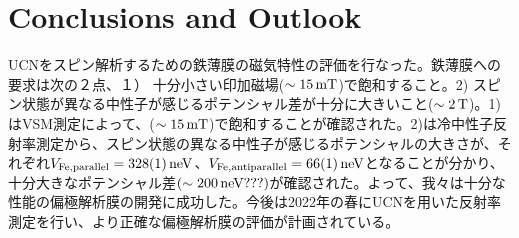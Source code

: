 \documentclass[onecolumn]{preport}
\begin{document}

\section{Conclusions and Outlook}
UCNをスピン解析するための鉄薄膜の磁気特性の評価を行なった。鉄薄膜への要求は次の２点、１） 十分小さい印加磁場($\sim 15\rm\,mT$)で飽和すること。2) スピン状態が異なる中性子が感じるポテンシャル差が十分に大きいこと($\sim 2\rm\,T$)。1)はVSM測定によって、($\sim 15\rm\,mT$)で飽和することが確認された。2)は冷中性子反射率測定から、スピン状態の異なる中性子が感じるポテンシャルの大きさが、それぞれ$V_{\rm Fe,parallel}=328(1)\,\rm neV$、$V_{\rm Fe,antiparallel}=66(1)\,\rm neV$となることが分かり、十分大きなポテンシャル差$(\sim 200\,\rm neV???)$が確認された。よって、我々は十分な性能の偏極解析膜の開発に成功した。今後は2022年の春にUCNを用いた反射率測定を行い、より正確な偏極解析膜の評価が計画されている。
\end{document}
